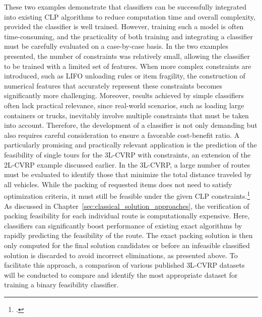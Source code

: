 These two examples demonstrate that classifiers can be successfully integrated into existing \gls{CLP}
algorithms to reduce computation time and overall complexity, provided the classifier is well trained.
However, training such a model is often time-consuming, and the practicality of both training and
integrating a classifier must be carefully evaluated on a case-by-case basis.
In the two examples presented, the number of constraints was relatively small, allowing the classifier
to be trained with a limited set of features. When more complex constraints are introduced, such as
\gls{LIFO} unloading rules or item fragility, the construction of numerical features that accurately
represent these constraints becomes significantly more challenging.
Moreover, results achieved by simple classifiers often lack practical relevance, since real-world
scenarios, such as loading large containers or trucks, inevitably involve multiple constraints that
must be taken into account. Therefore, the development of a classifier is not only demanding but also
requires careful consideration to ensure a favorable cost-benefit ratio.
A particularly promising and practically relevant application is the prediction of the feasibility of single tours for the
\gls{3L-CVRP} with constraints, an extension of the \gls{2L-CVRP} example discussed earlier. In the
\gls{3L-CVRP}, a large number of routes must be evaluated to identify those that minimize the total
distance traveled by all vehicles. While the packing of requested items does not need to satisfy
optimization criteria, it must still be feasible under the given \gls{CLP} constraints.\footcite[cf.][]{tamke_branch-and-cut_2024}
As discussed in Chapter~\ref{sec:classical_solution_approaches}, the verification of
packing feasibility for each individual route is computationally expensive.
Here, classifiers can significantly boost performance of existing exact algorithms by rapidly predicting the feasibility of the route. The
exact packing solution is then only computed for the final solution candidates or before an infeasible classified solution
is discarded to avoid incorrect eliminations, as presented above.
To facilitate this approach, a comparison of various published \gls{3L-CVRP} datasets will be conducted
to compare and identify the most appropriate dataset for training a binary feasibility classifier.